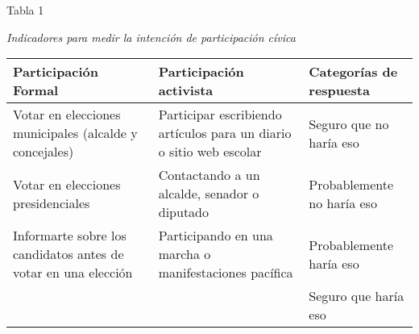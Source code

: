 \documentclass[12pt,twoside]{templates/facsothesis}
\begin{document}
Tabla 1

\emph{Indicadores para medir la intención de participación cívica}

\begin{longtable}[]{@{}lll@{}}
\toprule
\begin{minipage}[b]{0.28\columnwidth}\raggedright
\textbf{Participación Formal}\strut
\end{minipage} & \begin{minipage}[b]{0.32\columnwidth}\raggedright
\textbf{Participación activista}\strut
\end{minipage} & \begin{minipage}[b]{0.31\columnwidth}\raggedright
\textbf{Categorías de respuesta}\strut
\end{minipage}\tabularnewline
\midrule
\endhead
\begin{minipage}[t]{0.28\columnwidth}\raggedright
Votar en elecciones municipales (alcalde y concejales)\strut
\end{minipage} & \begin{minipage}[t]{0.32\columnwidth}\raggedright
Participar escribiendo artículos para un diario o sitio web escolar\strut
\end{minipage} & \begin{minipage}[t]{0.31\columnwidth}\raggedright
Seguro que no haría eso\strut
\end{minipage}\tabularnewline
\begin{minipage}[t]{0.28\columnwidth}\raggedright
Votar en elecciones presidenciales\strut
\end{minipage} & \begin{minipage}[t]{0.32\columnwidth}\raggedright
Contactando a un alcalde, senador o diputado\strut
\end{minipage} & \begin{minipage}[t]{0.31\columnwidth}\raggedright
Probablemente no haría eso\strut
\end{minipage}\tabularnewline
\begin{minipage}[t]{0.28\columnwidth}\raggedright
Informarte sobre los candidatos antes de votar en una elección\strut
\end{minipage} & \begin{minipage}[t]{0.32\columnwidth}\raggedright
Participando en una marcha o manifestaciones pacífica\strut
\end{minipage} & \begin{minipage}[t]{0.31\columnwidth}\raggedright
Probablemente haría eso\strut
\end{minipage}\tabularnewline
\begin{minipage}[t]{0.28\columnwidth}\raggedright
\strut
\end{minipage} & \begin{minipage}[t]{0.32\columnwidth}\raggedright
\strut
\end{minipage} & \begin{minipage}[t]{0.31\columnwidth}\raggedright
Seguro que haría eso\strut
\end{minipage}\tabularnewline
\bottomrule
\end{longtable}
\end{document}
